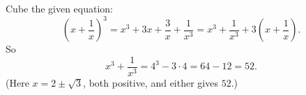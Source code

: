 Cube the given equation:
\[\left(x+\dfrac{1}{x}\right)^3=x^3+3x+\dfrac{3}{x}+\dfrac{1}{x^3}=x^3+\dfrac{1}{x^3}+3\left(x+\dfrac{1}{x}\right).\]
So
\[x^3+\dfrac{1}{x^3}=4^3-3\cdot4=64-12=\boxed{52}.\]
(Here $x=2\pm\sqrt3$, both positive, and either gives $52$.)
